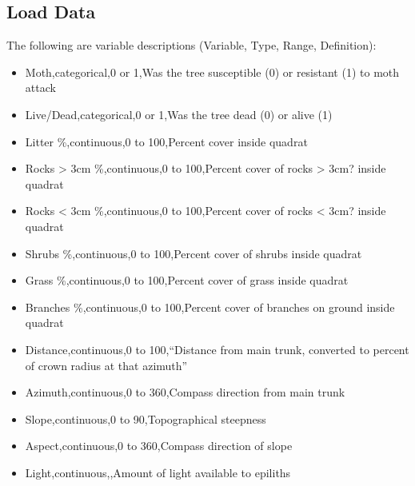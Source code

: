 \documentclass[]{article}
\providecommand{\tightlist}{%
  \setlength{\itemsep}{0pt}\setlength{\parskip}{0pt}}
\begin{document}
\subsection{Load Data}\label{load-data}

The following are variable descriptions (Variable, Type, Range,
Definition):

\begin{itemize}
\tightlist
\item
  Moth,categorical,0 or 1,Was the tree susceptible (0) or resistant (1)
  to moth attack
\item
  Live/Dead,categorical,0 or 1,Was the tree dead (0) or alive (1)
\item
  Litter \%,continuous,0 to 100,Percent cover inside quadrat
\item
  Rocks \textgreater{} 3cm \%,continuous,0 to 100,Percent cover of rocks
  \textgreater{} 3cm? inside quadrat
\item
  Rocks \textless{} 3cm \%,continuous,0 to 100,Percent cover of rocks
  \textless{} 3cm? inside quadrat
\item
  Shrubs \%,continuous,0 to 100,Percent cover of shrubs inside quadrat
\item
  Grass \%,continuous,0 to 100,Percent cover of grass inside quadrat
\item
  Branches \%,continuous,0 to 100,Percent cover of branches on ground
  inside quadrat
\item
  Distance,continuous,0 to 100,``Distance from main trunk, converted to
  percent of crown radius at that azimuth''
\item
  Azimuth,continuous,0 to 360,Compass direction from main trunk
\item
  Slope,continuous,0 to 90,Topographical steepness
\item
  Aspect,continuous,0 to 360,Compass direction of slope
\item
  Light,continuous,,Amount of light available to epiliths
\end{itemize}
\end{document}
